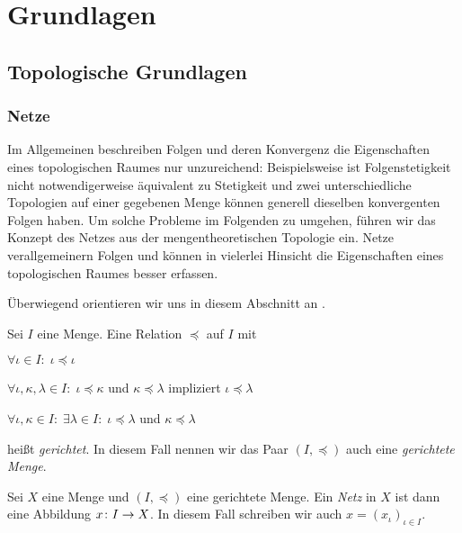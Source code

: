 \documentclass[../main/main.tex]{subfiles}
\begin{document}
	
	\section{Grundlagen}
	
	\subsection{Topologische Grundlagen}
	
	\subsubsection*{Netze}
	
	Im Allgemeinen beschreiben Folgen und deren Konvergenz die Eigenschaften eines topologischen Raumes nur unzureichend:
	Beispielsweise ist Folgenstetigkeit nicht notwendigerweise äquivalent zu Stetigkeit und zwei unterschiedliche Topologien auf einer 
	gegebenen Menge können generell dieselben konvergenten Folgen haben. Um solche Probleme im Folgenden zu umgehen, führen wir das
	Konzept des Netzes aus der mengentheoretischen Topologie ein. Netze verallgemeinern Folgen und können in vielerlei Hinsicht die 
	Eigenschaften eines topologischen Raumes besser erfassen.
	
	Überwiegend orientieren wir uns in diesem Abschnitt an \cite[Kapitel 2.6]{Simon.2015}.
	
	\begin{Definition}
		\label{def:directedset}
		Sei $I$ eine Menge. Eine Relation $\preceq$ auf $I$ mit
		\begin{enumeratethm}
			\item $\forall \iota \in I: \; \iota \preceq \iota$
			\item $\forall \iota, \kappa, \lambda \in I: \; \iota \preceq \kappa$ und $\kappa \preceq \lambda$ impliziert $\iota \preceq \lambda$
			\item $\forall \iota, \kappa \in I: \; \exists \lambda \in I: \; \iota \preceq \lambda$ und $\kappa \preceq \lambda$
		\end{enumeratethm}
		heißt \emph{gerichtet}. In diesem Fall nennen wir das Paar $(I, \preceq)$ auch eine \emph{gerichtete Menge}.
	\end{Definition}
	
	\begin{Definition}[Netz]
		Sei $X$ eine Menge und $(I, \preceq)$ eine gerichtete Menge. Ein \emph{Netz} in $X$ ist dann eine Abbildung $x \colon I \to X$. In diesem
		Fall schreiben wir auch $x = (x_\iota)_{\iota \in I}$.
	\end{Definition}
	
\end{document}

